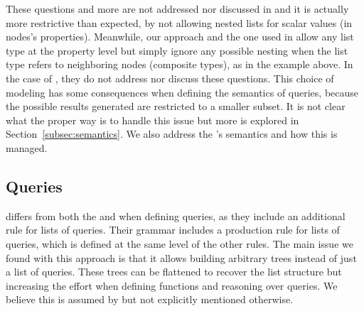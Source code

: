 These questions and more  are not addressed nor discussed in \HP and it is actually more restrictive than expected, by not allowing nested lists for scalar values (in nodes's properties). Meanwhile, our approach and the one used in \cite{olafschema} allow any list type at the property level but simply ignore any possible nesting when the list type refers to neighboring nodes (composite types), as in the example above.
In the case of \cite{olafschema}, they do not address nor discuss these questions. This choice of modeling has some consequences when defining the semantics of \gql queries, because the possible results generated are restricted to a smaller subset. It is not clear what the proper way is to handle this issue but more is explored in Section~\ref{subsec:semantics}. 
We also address the \spec's semantics and how this is managed.

\subsection{Queries}


\HP differs from both the \spec and \gcoql when defining queries, as they include an additional rule for lists of queries. Their grammar includes a production rule for lists of queries, which is defined at the same level of  the other rules. The main issue we found with this approach is that it allows building arbitrary trees instead of just a list of queries. These trees can be flattened to recover the list structure but increasing the effort when defining functions and reasoning over queries. We believe this is assumed by \HP but not explicitly mentioned otherwise.


